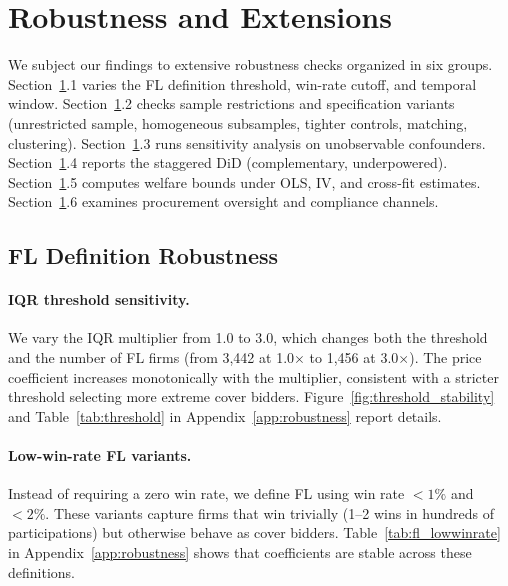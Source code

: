 \section{Robustness and Extensions}
\label{sec:robustness}

We subject our findings to extensive robustness checks organized in six
groups. Section~\ref{sec:robustness}.1 varies the FL definition
threshold, win-rate cutoff, and temporal window.
Section~\ref{sec:robustness}.2 checks sample restrictions and
specification variants (unrestricted sample, homogeneous subsamples,
tighter controls, matching, clustering).
Section~\ref{sec:robustness}.3 runs sensitivity analysis on unobservable
confounders. Section~\ref{sec:robustness}.4 reports the staggered DiD
(complementary, underpowered). Section~\ref{sec:robustness}.5 computes
welfare bounds under OLS, IV, and cross-fit estimates.
Section~\ref{sec:robustness}.6 examines procurement oversight and
compliance channels.

\subsection{FL Definition Robustness}

\paragraph{IQR threshold sensitivity.}
We vary the IQR multiplier from 1.0 to 3.0, which changes both the
threshold and the number of FL firms (from 3,442 at 1.0$\times$ to 1,456
at 3.0$\times$). The price coefficient increases monotonically with the
multiplier, consistent with a stricter threshold selecting more extreme
cover bidders.
Figure~\ref{fig:threshold_stability} and Table~\ref{tab:threshold} in
Appendix~\ref{app:robustness} report details.

\paragraph{Low-win-rate FL variants.}
Instead of requiring a zero win rate, we define FL using win rate
$< 1\%$ and $< 2\%$. These variants capture firms that win trivially
(1--2 wins in hundreds of participations) but otherwise behave as cover
bidders. Table~\ref{tab:fl_lowwinrate} in Appendix~\ref{app:robustness}
shows that coefficients are stable across these definitions.


